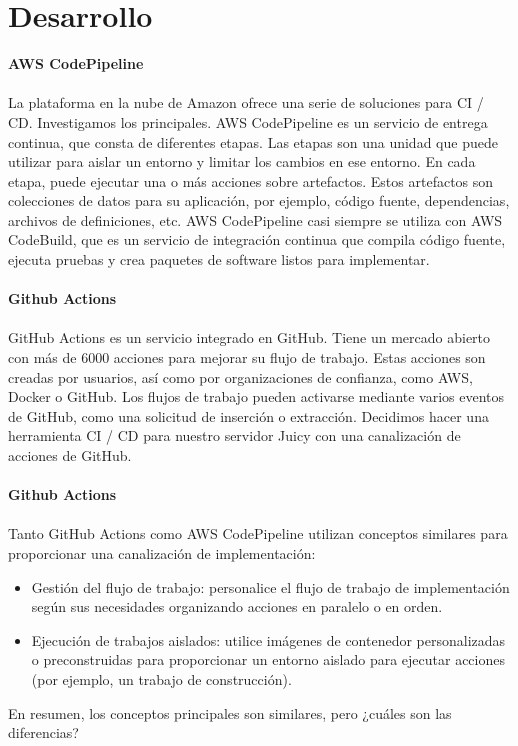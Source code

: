 \documentclass[twoside,twocolumn]{article}
\begin{document}
\section{Desarrollo}
\textbf{AWS CodePipeline}
\\\\La plataforma en la nube de Amazon ofrece una serie de soluciones para CI / CD. Investigamos los principales.
AWS CodePipeline es un servicio de entrega continua, que consta de diferentes etapas. Las etapas son una unidad que puede utilizar para aislar un entorno y limitar los cambios en ese entorno. En cada etapa, puede ejecutar una o más acciones sobre artefactos. Estos artefactos son colecciones de datos para su aplicación, por ejemplo, código fuente, dependencias, archivos de definiciones, etc.
AWS CodePipeline casi siempre se utiliza con AWS CodeBuild, que es un servicio de integración continua que compila código fuente, ejecuta pruebas y crea paquetes de software listos para implementar.
\\\\
\textbf{Github Actions}
\\\\GitHub Actions es un servicio integrado en GitHub. Tiene un mercado abierto con más de 6000 acciones para mejorar su flujo de trabajo. Estas acciones son creadas por usuarios, así como por organizaciones de confianza, como AWS, Docker o GitHub. Los flujos de trabajo pueden activarse mediante varios eventos de GitHub, como una solicitud de inserción o extracción. Decidimos hacer una herramienta CI / CD para nuestro servidor Juicy con una canalización de acciones de GitHub. 
\\\\
\textbf{Github Actions}
\\\\Tanto GitHub Actions como AWS CodePipeline utilizan conceptos similares para proporcionar una canalización de implementación:
\begin{itemize}
    \item Gestión del flujo de trabajo: personalice el flujo de trabajo de implementación según sus necesidades organizando acciones en paralelo o en orden.
    \item Ejecución de trabajos aislados: utilice imágenes de contenedor personalizadas o preconstruidas para proporcionar un entorno aislado para ejecutar acciones (por ejemplo, un trabajo de construcción).
\end{itemize}
En resumen, los conceptos principales son similares, pero ¿cuáles son las diferencias?
\end{document}
